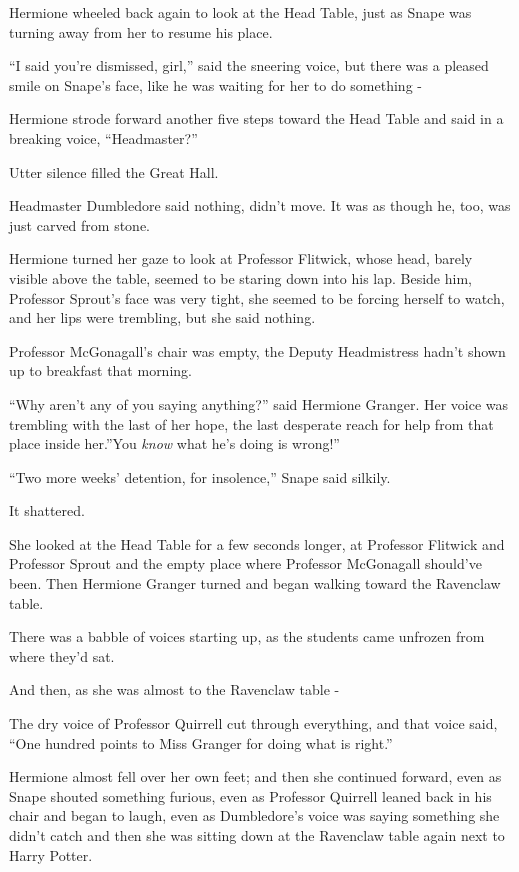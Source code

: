 Hermione wheeled back again to look at the Head Table, just as Snape was
turning away from her to resume his place.

``I said you're dismissed, girl,'' said the sneering voice, but there
was a pleased smile on Snape's face, like he was waiting for her to do
something -

Hermione strode forward another five steps toward the Head Table and
said in a breaking voice, ``Headmaster?''

Utter silence filled the Great Hall.

Headmaster Dumbledore said nothing, didn't move. It was as though he,
too, was just carved from stone.

Hermione turned her gaze to look at Professor Flitwick, whose head,
barely visible above the table, seemed to be staring down into his lap.
Beside him, Professor Sprout's face was very tight, she seemed to be
forcing herself to watch, and her lips were trembling, but she said
nothing.

Professor McGonagall's chair was empty, the Deputy Headmistress hadn't
shown up to breakfast that morning.

``Why aren't any of you saying anything?'' said Hermione Granger. Her
voice was trembling with the last of her hope, the last desperate reach
for help from that place inside her.''You \emph{know} what he's doing is
wrong!''

``Two more weeks' detention, for insolence,'' Snape said silkily.

It shattered.

She looked at the Head Table for a few seconds longer, at Professor
Flitwick and Professor Sprout and the empty place where Professor
McGonagall should've been. Then Hermione Granger turned and began
walking toward the Ravenclaw table.

There was a babble of voices starting up, as the students came unfrozen
from where they'd sat.

And then, as she was almost to the Ravenclaw table -

The dry voice of Professor Quirrell cut through everything, and that
voice said, ``One hundred points to Miss Granger for doing what is
right.''

Hermione almost fell over her own feet; and then she continued forward,
even as Snape shouted something furious, even as Professor Quirrell
leaned back in his chair and began to laugh, even as Dumbledore's voice
was saying something she didn't catch and then she was sitting down at
the Ravenclaw table again next to Harry Potter.

